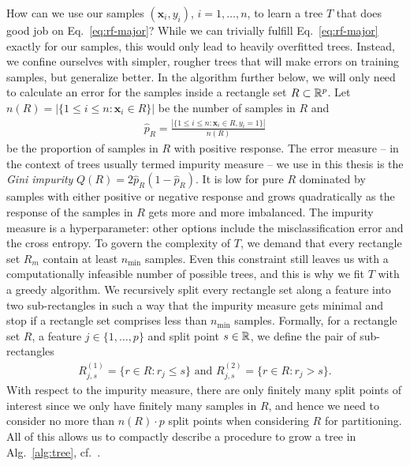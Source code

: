 How can we use our samples $(\mathbf{x}_i, y_i)$, $i = 1, \ldots, n$, to learn a tree $T$ that does 
good job on Eq.\ \eqref{eq:rf-major}? While we can 
trivially fulfill Eq.\ \eqref{eq:rf-major} exactly for our samples, this would only lead to heavily
overfitted trees. Instead, we confine ourselves with simpler, rougher trees that will make errors on 
training samples, but generalize better. 
In the algorithm further below, we will only need to calculate an error for the samples inside a 
rectangle set $R \subset \mathbb{R}^p$. Let $n(R) = |\{ 1 \leq i \leq n: \mathbf{x}_i \in R \}|$ be the number of 
samples in $R$ and
\begin{align}
    \hat{p}_R = \frac{|\{ 1 \leq i \leq n: \mathbf{x}_i \in R, y_i = 1 \}|}{n(R)}
\end{align}
be the proportion of samples in $R$ with positive response. The error measure -- in the context of 
trees usually termed impurity measure -- we use in this thesis
is the \textit{Gini impurity} $Q(R) = 2 \hat{p}_R (1 - \hat{p}_R)$. It is low for pure $R$ dominated by 
samples with either positive or negative response and grows quadratically as the response of the 
samples in $R$ gets more and more imbalanced. The impurity measure is a hyperparameter: other 
options include the misclassification error and the cross entropy. To govern the complexity of $T$,
we demand that every rectangle set $R_m$ contain at least $n_\text{min}$ samples. Even this 
constraint still leaves us with a computationally infeasible number of possible trees, and this is 
why we fit $T$ with a greedy algorithm. We recursively split every rectangle set along a 
feature into two sub-rectangles in such a way that the impurity measure gets minimal and stop if 
a rectangle set comprises less than $n_\text{min}$ samples. Formally, for a rectangle set $R$, a 
feature $j \in \{1, \ldots, p\}$ and split point $s \in \mathbb{R}$, we define 
the pair of sub-rectangles
\begin{align}
    R^{(1)}_{j, s} = \{r \in R: r_j \leq s\} \text{ and } R^{(2)}_{j, s} = \{r \in R: r_j > s\}.
\end{align}
With respect to the impurity measure, there are only finitely many split points of interest since 
we only have finitely many samples in $R$, and hence we need to consider no more than $n(R) \cdot p$ split 
points when 
considering $R$ for partitioning. All of this allows us to compactly describe a procedure to grow a 
tree in Alg.\ \ref{alg:tree}, cf.\ \cite{breiman84}.


